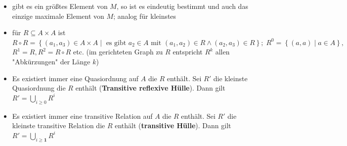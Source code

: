 \documentclass[10pt,a4paper]{article}
\begin{document}
\begin{itemize}
\item gibt es ein größtes Element von $M$, so ist es eindeutig bestimmt und auch das einzige maximale Element von $M$; analog für kleinstes 
\item für $R\subseteq A\times A$ ist $R\circ R=\left\lbrace (a_{1},a_{3})\in A\times A\mid \text{ es gibt } a_{2} \in A \text{ mit } (a_{1},a_{2}) \in R\land (a_{2},a_{3})\in R\right\rbrace; \;R^{0}=\left\lbrace (a,a) \mid a\in A\right\rbrace,$\\ $R^{1}=R, R^{2}=R\circ R$ etc. (im gerichteten Graph zu $R$ entspricht $R^{k}$ allen "Abkürzungen" der Länge $k$)
\item Es existiert immer eine Quasiordnung auf $A$ die $R$ enthält. Sei $R'$ die kleinste Quasiordnung die $R$ enthält (\textbf{Transitive reflexive Hülle}). Dann gilt $R'=\bigcup_{i\geq 0} R^{i}$
\item Es existiert immer eine transitive Relation auf $A$ die $R$ enthält. Sei $R'$ die kleinste transitive Relation die $R$ enthält (\textbf{transitive Hülle}). Dann gilt $R'=\bigcup_{i\geq \boldsymbol{1}} R^{i}$
\end{itemize}
\end{document}
